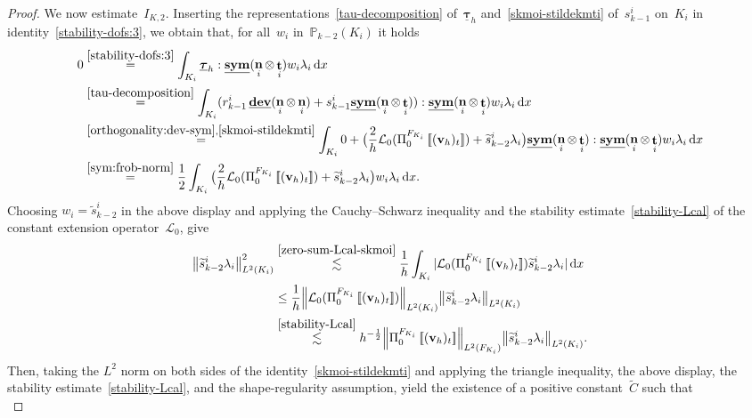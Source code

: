 \documentclass[10pt,a4paper]{amsart}
\newcommand{\Ctilde}{\widetilde{C}}
\newcommand{\F}{F}
\newcommand{\Fi}{{\F_{\Ki}}}
\newcommand{\IKtwo}{I_{\K,2}}
\newcommand{\K}{K}
\newcommand{\Ki}{{\K_i}}
\newcommand{\Lcalzero}{\mathcal{L}_0}
\newcommand{\Ltwo}{L^2}
\newcommand{\Norm}[1]{{\left\|{#1} \right\|}}
\newcommand{\Pbbkmt}{\mathbb{P}_{k-2}}
\newcommand{\PizFi}{\Pi_0^{\Fi}}
\DeclareMathOperator{\dev}{\underline{\mathbf{dev}}}
\newcommand{\dx}{\, \mathrm{d}x}
\newcommand{\jump}[1]{\left[\!\left[#1\right]\!\right]}
\newcommand{\lambdai}{\lambda_i}
\DeclareMathOperator{\norm}{\bf{n}}
\newcommand{\normi}{\norm_i}
\newcommand{\rkmoi}{r_{k-1}^i}
\newcommand{\skmoi}{s_{k-1}^i}
\newcommand{\stildekmt}{\widetilde{s}_{k-2}}
\newcommand{\stildekmti}{\stildekmt^i}
\newcommand{\sym}{\underline{\bf{sym}}}
\DeclareMathOperator{\tang}{\bf{t}}
\newcommand{\tangi}{\tang_i}
\newcommand{\tangscalar}{t}
\newcommand{\taubfh}{\underline{\boldsymbol{\tau}}_h}
\newcommand{\vbfh}{\mathbf{v}_h}
\newcommand{\wi}{w_i}
\begin{document}
\begin{proof}
We now estimate~$\IKtwo$.
Inserting the representations~\eqref{tau-decomposition} of~$\taubfh$
and~\eqref{skmoi-stildekmti} of~$\skmoi$ on~$\Ki$
in identity~\eqref{stability-dofs:3},
we obtain that,
for all~$\wi$ in~$\Pbbkmt(\Ki)$
it holds
\begin{equation} \label{zero-sum-Lcal-skmoi}
\begin{split}
0
&\overset{\eqref{stability-dofs:3}}{=}
\int_{\Ki} \taubfh : \sym(\normi\otimes\tangi)\wi\lambdai \dx \\
&\overset{\eqref{tau-decomposition}}{=}
\int_{\Ki} (\rkmoi\dev(\normi\otimes\normi) + \skmoi\sym(\normi\otimes\tangi)) : \sym(\normi\otimes\tangi)\wi\lambdai \dx \\
&\overset{\eqref{orthogonality:dev-sym},\eqref{skmoi-stildekmti}}{=}
\int_{\Ki} 0 + \big(\frac{2}{h}\Lcalzero(\PizFi\jump{(\vbfh)_{\tangscalar}}) + \stildekmti\lambdai\big) \sym(\normi\otimes\tangi) : \sym(\normi\otimes\tangi)\wi\lambdai \dx \\
&\overset{\eqref{sym:frob-norm}}{=}
\frac12 \int_{\Ki} \big(\frac{2}{h}\Lcalzero(\PizFi\jump{(\vbfh)_{\tangscalar}}) + \stildekmti\lambdai\big)\wi\lambdai \dx.
\end{split}
\end{equation}
Choosing
$\wi = \stildekmti$ in the above display
and applying
the Cauchy--Schwarz inequality
and the stability estimate~\eqref{stability-Lcal} of the constant extension operator~$\Lcalzero$,
give
\begin{equation*}
\begin{split}
\Norm{\stildekmti\lambdai}_{\Ltwo(\Ki)}^2
&\overset{\eqref{zero-sum-Lcal-skmoi}}{\lesssim}
\frac{1}{h}\int_{\Ki}|\Lcalzero(\PizFi\jump{(\vbfh)_{\tangscalar}})\stildekmti\lambdai| \dx \\
&\leq \frac{1}{h}\Norm{\Lcalzero(\PizFi\jump{(\vbfh)_{\tangscalar}})}_{\Ltwo(\Ki)}\Norm{\stildekmti\lambdai}_{\Ltwo(\Ki)} \\
&\overset{\eqref{stability-Lcal}}{\lesssim}
h^{-\frac12}\Norm{\PizFi\jump{(\vbfh)_{\tangscalar}}}_{\Ltwo(\Fi)}\Norm{\stildekmti\lambdai}_{\Ltwo(\Ki)}.
\end{split} 
\end{equation*}
Then,
taking the $\Ltwo$ norm on both sides of the identity~\eqref{skmoi-stildekmti}
and applying 
the triangle inequality,
the above display,
the stability estimate~\eqref{stability-Lcal},
and the shape-regularity assumption,
yield
the existence of a positive constant~$\Ctilde$
such that
\begin{equation} \label{skmoi-leq-PizF}

\end{equation}
\end{proof}
\end{document}
